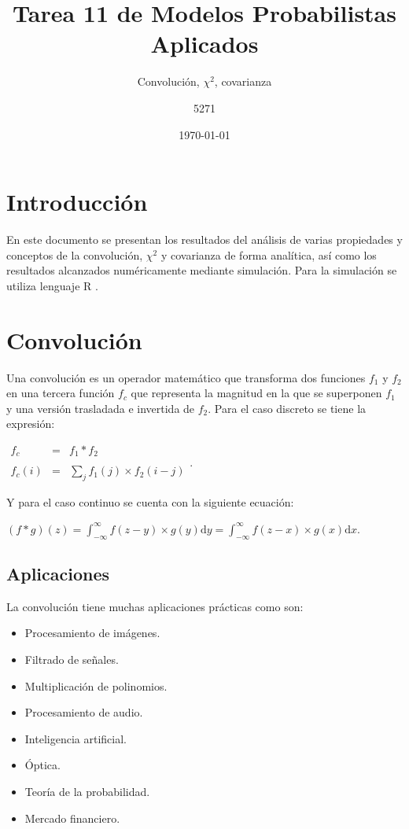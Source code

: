 \documentclass{article}
\title{Tarea 11 de Modelos Probabilistas Aplicados}
\subtitle{Convolución, $\chi^2$, covarianza}
\author{5271}
\date{\today}
\begin{document}
\maketitle
\section{Introducción}
En este documento se presentan los resultados del análisis de varias propiedades y conceptos de la convolución, $\chi^2$ y covarianza de forma analítica, así como los resultados alcanzados numéricamente mediante simulación. Para la simulación se utiliza lenguaje R \cite{R}.
\section{Convolución}
Una convolución es un operador matemático que transforma dos funciones $f_1$ y $f_2$ en una tercera función $f_c$ que representa la magnitud en la que se superponen $f_1$ y una versión trasladada e invertida de $f_2$. Para el caso discreto se tiene la expresión:

$\begin{array}{rcl} f_c &=& f_1 \ast f_2 \\
& \\
          f_c(i) &=& \sum_j f_1(j) \times f_2(i - j) \end{array}$.
          
Y para el caso continuo se cuenta con la siguiente ecuación:

$(f \ast g)(z) = \displaystyle\int_{-\infty}^\infty f(z - y) \times g(y) \text{d} y =
	      \displaystyle\int_{-\infty}^\infty f(z - x) \times g(x)
	      \text{d} x.$
\subsection{Aplicaciones}
 La convolución tiene muchas aplicaciones prácticas como son:
 \begin{itemize}
     \item Procesamiento de imágenes.
     \item Filtrado de señales.
     \item Multiplicación de polinomios.
     \item Procesamiento de audio.
     \item Inteligencia artificial.
     \item Óptica.
     \item Teoría de la probabilidad.
     \item Mercado financiero.
 \end{itemize}
 
\end{document}
